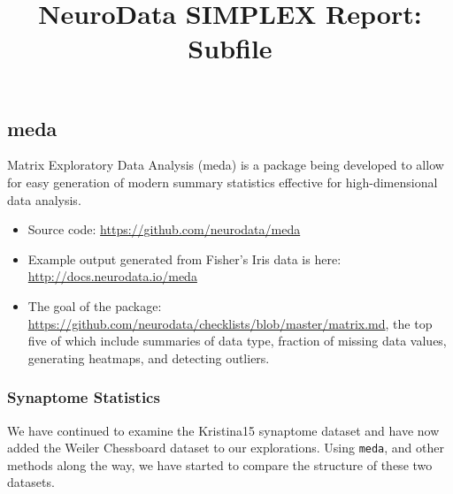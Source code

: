 \documentclass[simplex.tex]{subfiles}
\title{NeuroData SIMPLEX Report: Subfile}
\begin{document}


\subsection{meda}

Matrix Exploratory Data Analysis (meda) is a package being developed to
allow for easy generation of modern summary statistics effective for
high-dimensional data analysis. 

\begin{itemize}
  \item Source code: \href{https://github.com/neurodata/meda}{https://github.com/neurodata/meda}
  \item Example output generated from Fisher's Iris data is here:
    \href{http://docs.neurodata.io/meda}{http://docs.neurodata.io/meda}
  \item The goal of the package:
    \href{https://github.com/neurodata/checklists/blob/master/matrix.md}{https://github.com/neurodata/checklists/blob/master/matrix.md}, the top five of which include summaries of data type, fraction of missing data values, generating heatmaps, and detecting outliers.
\end{itemize}

\subsubsection{Synaptome Statistics}

We have continued to examine the Kristina15 synaptome dataset and have
now added the Weiler Chessboard dataset to our explorations.  Using 
\verb+meda+, and other methods along the way, we have started to compare
the structure of these two datasets.  
\end{document}
